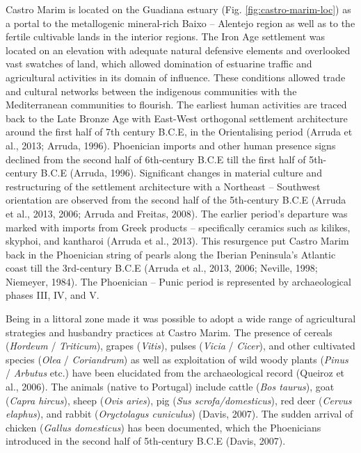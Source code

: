 \documentclass[3p]{elsarticle} %
\begin{document}
Castro Marim is located on the Guadiana estuary (Fig. \ref{fig:castro-marim-loc}) as a portal to the metallogenic mineral-rich Baixo -- Alentejo region as well as to the fertile cultivable lands in the interior regions. The Iron Age settlement was located on an elevation with adequate natural defensive elements and overlooked vast swatches of land, which allowed domination of estuarine traffic and agricultural activities in its domain of influence. These conditions allowed trade and cultural networks between the indigenous communities with the Mediterranean communities to flourish. The earliest human activities are traced back to the Late Bronze Age with East-West orthogonal settlement architecture around the first half of 7th century B.C.E, in the Orientalising period (Arruda et al., 2013; Arruda, 1996). Phoenician imports and other human presence signs declined from the second half of 6th-century B.C.E till the first half of 5th-century B.C.E (Arruda, 1996). Significant changes in material culture and restructuring of the settlement architecture with a Northeast -- Southwest orientation are observed from the second half of the 5th-century B.C.E (Arruda et al., 2013, 2006; Arruda and Freitas, 2008). The earlier period's departure was marked with imports from Greek products -- specifically ceramics such as kilikes, skyphoi, and kantharoi (Arruda et al., 2013). This resurgence put Castro Marim back in the Phoenician string of pearls along the Iberian Peninsula's Atlantic coast till the 3rd-century B.C.E (Arruda et al., 2013, 2006; Neville, 1998; Niemeyer, 1984). The Phoenician -- Punic period is represented by archaeological phases III, IV, and V.

Being in a littoral zone made it was possible to adopt a wide range of agricultural strategies and husbandry practices at Castro Marim. The presence of cereals (\emph{Hordeum} / \emph{Triticum}), grapes (\emph{Vitis}), pulses (\emph{Vicia} / \emph{Cicer}), and other cultivated species (\emph{Olea} / \emph{Coriandrum}) as well as exploitation of wild woody plants (\emph{Pinus} / \emph{Arbutus} etc.) have been elucidated from the archaeological record (Queiroz et al., 2006). The animals (native to Portugal) include cattle (\emph{Bos taurus}), goat (\emph{Capra hircus}), sheep (\emph{Ovis aries}), pig (\emph{Sus scrofa/domesticus}), red deer (\emph{Cervus elaphus}), and rabbit (\emph{Oryctolagus cuniculus}) (Davis, 2007). The sudden arrival of chicken (\emph{Gallus domesticus}) has been documented, which the Phoenicians introduced in the second half of 5th-century B.C.E (Davis, 2007).
\end{document}

